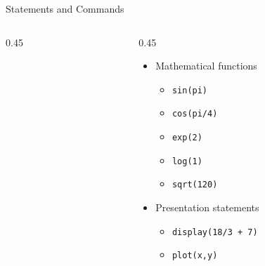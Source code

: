 {}\documentclass[letterpaper,
compress,
xcolor=x11names,
]{beamer}
\begin{document}
\begin{frame}{Statements and Commands}
\begin{columns}
\begin{column}{0.45\linewidth}
\begin{itemize}
			\end{itemize}
		\end{column}
		\begin{column}{0.45\linewidth}
			\begin{itemize}
				\item Mathematical functions 
				\begin{itemize}
					\item \texttt{sin(pi)}
					\item \texttt{cos(pi/4)}
					\item \texttt{exp(2)}
					\item \texttt{log(1)}
					\item \texttt{sqrt(120)}
				\end{itemize}
				\item Presentation statements 
				\begin{itemize}
					\item \texttt{display(18/3 + 7)}
					\item \texttt{plot(x,y)}
				\end{itemize}
			\end{itemize}
		\end{column}
	\end{columns}
\end{frame}
\end{document}
